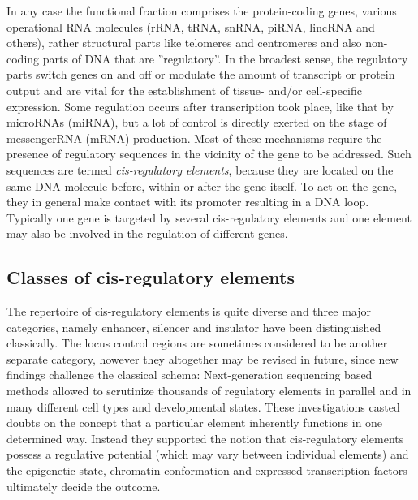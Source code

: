 In any case the functional fraction comprises the protein-coding genes, various operational RNA molecules (rRNA, tRNA, snRNA, piRNA, lincRNA and others), rather structural parts like telomeres and centromeres and also non-coding parts of DNA that are ''regulatory''\cite{Ward2012}. In the broadest sense, the regulatory parts switch genes on and off or modulate the amount of transcript or protein output and are vital for the establishment of tissue- and/or cell-specific expression. Some regulation occurs after transcription took place, like that by microRNAs (miRNA), but a lot of control is directly exerted on the stage of messengerRNA (mRNA) production. Most of these mechanisms require the presence of regulatory sequences in the vicinity of the gene to be addressed. Such sequences are termed \emph{cis-regulatory elements}, because they are located on the same DNA molecule before, within or after the gene itself. To act on the gene, they in general make contact with its promoter resulting in a DNA loop\cite{Noordermeer2013,Grubert2015}. Typically one gene is targeted by several cis-regulatory elements and one element may also be involved in the regulation of different genes\cite{Bertolino2016,Javierre2016,Allahyar2018}.
 
\subsection{Classes of cis-regulatory elements}
\label{chap:i:enhancers:cisclasses}

The repertoire of cis-regulatory elements is quite diverse and three major categories, namely enhancer, silencer and insulator have been distinguished classically. The locus control regions are sometimes considered to be another separate category, however they altogether may be revised in future, since new findings challenge the classical schema: Next-generation sequencing based methods allowed to scrutinize thousands of regulatory elements in parallel and in many different cell types and developmental states. These investigations casted doubts on the concept that a particular element inherently functions in one determined way. Instead they supported the notion that cis-regulatory elements possess a regulative potential (which may vary between individual elements) and the epigenetic state, chromatin conformation and expressed transcription factors ultimately decide the outcome\cite{Stampfel2015}. 

